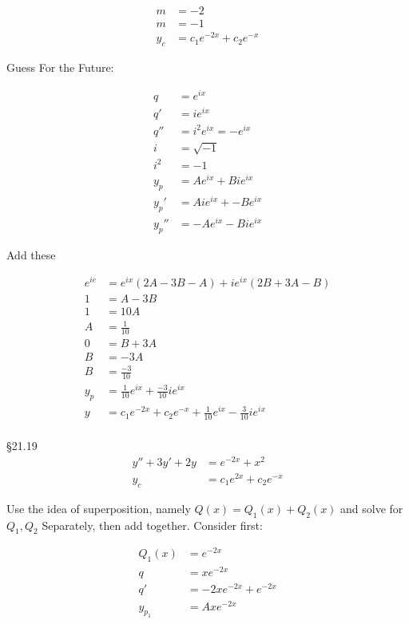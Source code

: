 \begin{rvw}
\begin{ex}
\begin{align*}
    m&=-2\\
    m&=-1\\
    y_c&= c_1 e^{-2x}+c_2e^{-x}
\end{align*}
\begin{note}
Guess For the Future:
\end{note}
\begin{align*}
    q&=e^{ix}\\
    q'&=ie^{ix}\\
    q''&=i^2e^{ix}=-e^{ix}\\
    i&=\sqrt{-1}\\
    i^2&=-1\\
    y_p&=Ae^{ix}+Bie^{ix}\\
    y_p'&=Aie^{ix}+-Be^{ix}\\
    y_p''&=-Ae^{ix}-Bie^{ix}
\end{align*}
\begin{note}
Add these
\end{note}
\begin{align*}
    e^{ie}&=e^{ix}(2A-3B-A)+ie^{ix}(2B+3A-B)\\
    1&=A-3B\\
    1&=10A\\
    A&=\frac{1}{10}\\
    0&=B+3A\\
    B&=-3A\\
    B&=\frac{-3}{10}\\
    y_p&=\frac{1}{10}e^{ix}+\frac{-3}{10}ie^{ix}\\
    y&=c_1e^{-2x}+c_2e^{-x}+\frac{1}{10}e^{ix}-\frac{3}{10}ie^{ix}\\
\end{align*}
\end{ex}
\begin{ex}
\S 21.19
\begin{align*}
    y''+3y'+2y&=e^{-2x}+x^2\\
    y_c&=c_1e^{2x}+c_2e^{-x}
\end{align*}
\begin{note}
Use the idea of superposition, namely $Q(x)=Q_1(x)+Q_2(x)$ and solve for $Q_1, Q_2$ Separately, then add together. Consider first:
\end{note}
\begin{align*}
    Q_1(x)&=e^{-2x}\\
    q&=xe^{-2x}\\
    q'&=-2xe^{-2x}+e^{-2x}\\
    y_{p_1}&= Axe^{-2x}\\
\end{align*}

\end{ex}
\end{rvw}

